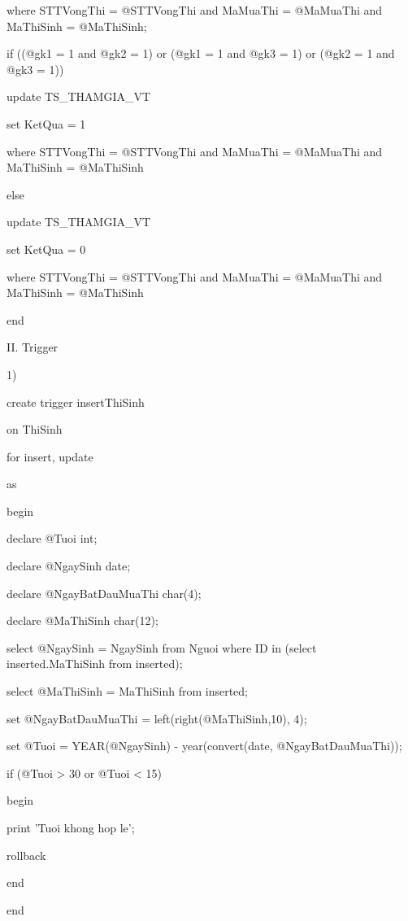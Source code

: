 \documentclass{report}
\begin{document}
	where STTVongThi = @STTVongThi and MaMuaThi = @MaMuaThi and MaThiSinh = @MaThiSinh;
	
	\smallskip
	if ((@gk1 = 1 and @gk2 = 1) or (@gk1 = 1 and @gk3 = 1) or (@gk2 = 1 and @gk3 = 1))
	
		\setlength{\parindent}{2.5cm}
		update TS\_THAMGIA\_VT
		
		set KetQua = 1
		
		where STTVongThi = @STTVongThi and MaMuaThi = @MaMuaThi and MaThiSinh = @MaThiSinh 
		
		\setlength{\parindent}{1.5cm}
	else
	
		\setlength{\parindent}{2.5cm}
		update TS\_THAMGIA\_VT
		
		set KetQua = 0
		
		where STTVongThi = @STTVongThi and MaMuaThi = @MaMuaThi and MaThiSinh = @MaThiSinh
	
	\setlength{\parindent}{0.5cm}
end

\bigskip

\setlength{\parindent}{0cm}
II. Trigger 

1)

\setlength{\parindent}{0.5cm}
create trigger insertThiSinh

on ThiSinh

for insert, update

as

begin
	
	\setlength{\parindent}{1.5cm}
	declare @Tuoi int;
	
	declare @NgaySinh date;
	
	declare @NgayBatDauMuaThi char(4);
	
	declare @MaThiSinh char(12);
	
	select @NgaySinh = NgaySinh from Nguoi where ID in (select inserted.MaThiSinh from inserted); 
	
	select @MaThiSinh = MaThiSinh from inserted;
	
	set @NgayBatDauMuaThi = left(right(@MaThiSinh,10), 4);
	
	set @Tuoi = YEAR(@NgaySinh) - year(convert(date, @NgayBatDauMuaThi));
	
	if (@Tuoi > 30 or @Tuoi < 15)
	
	begin
	
		\setlength{\parindent}{2.5cm}
		print 'Tuoi khong hop le';
		
		rollback
	
	\setlength{\parindent}{1.5cm}
	end
	
	\setlength{\parindent}{0.5cm}
end
\end{document}
